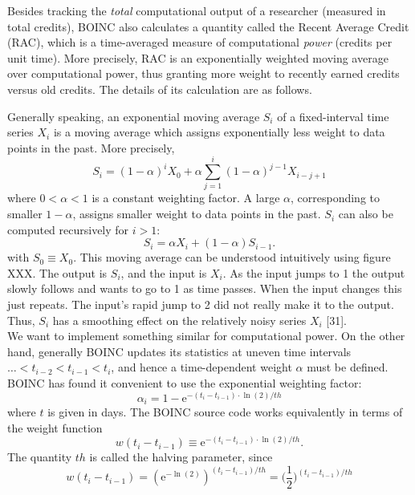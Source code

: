 Besides tracking the \textit{total} computational output of a researcher (measured in total credits), BOINC also calculates a quantity called the Recent Average Credit (RAC), which is a time-averaged measure of computational \textit{power} (credits per unit time). More precisely, RAC is an exponentially weighted moving average over computational power, thus granting more weight to recently earned credits versus old credits. The details of its calculation are as follows.

Generally speaking, an exponential moving average $S_i$ of a fixed-interval time series $X_i$ is a moving average which assigns exponentially less weight to data points in the past. More precisely,
\begin{equation}
S_i = (1-\alpha)^i X_0 + \alpha \sum_{j = 1}^i (1-\alpha)^{j-1} X_{i-j+1}
\end{equation} 
where $0 < \alpha < 1$ is a constant weighting factor. A large $\alpha$, corresponding to smaller $1-\alpha$, assigns smaller weight to data points in the past. $S_i$ can also be computed recursively for $i > 1$:
\begin{equation}
S_i = \alpha X_i + (1-\alpha) S_{i-1}.
\end{equation}
with $S_0 \equiv X_0$. This moving average can be understood intuitively using figure XXX. The output is $S_i$, and the input is $X_i$. As the input jumps to 1 the output slowly follows and wants to go to 1 as time passes. When the input changes this just repeats. The input’s rapid jump to 2 did not really make it to the output. Thus, $S_i$ has a smoothing effect on the relatively noisy series $X_i$ [31]. \\
We want to implement something similar for computational power. On the other hand, generally BOINC updates its statistics at uneven time intervals $\ldots <  t_{i-2} < t_{i-1} < t_i$, and hence a time-dependent weight $\alpha$ must be defined. BOINC has found it convenient to use the exponential weighting factor:
\begin{equation}
\alpha_i = 1 - \mathrm{e}^{-(t_i-t_{i-1}) \cdot  \ln(2) / th}  
\end{equation}
where $t$ is given in days. The BOINC source code works equivalently in terms of the weight function 
\begin{equation}
w(t_i - t_{i-1}) \equiv \mathrm{e}^{-(t_i-t_{i-1}) \cdot  \ln(2) / th}.
\end{equation}
 The quantity $th$ is called the halving parameter, since
\begin{equation}
w(t_i - t_{i-1})  =  \left( \mathrm{e}^{-\ln(2)} \right)^{(t_i-t_{i-1})/th} = \bigg(\frac{1}{2}\bigg)^{(t_i-t_{i-1})/th}
\end{equation}
